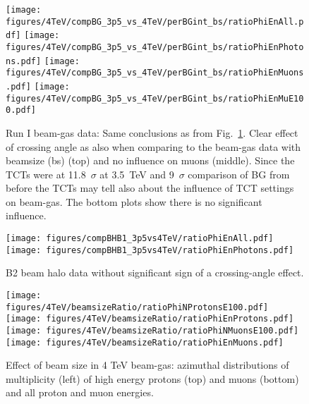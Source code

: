 \begin{figure}
\begin{center}
  \texttt{[image: figures/4TeV/compBG\_3p5\_vs\_4TeV/perBGint\_bs/ratioPhiEnAll.pdf]}
  \texttt{[image: figures/4TeV/compBG\_3p5\_vs\_4TeV/perBGint\_bs/ratioPhiEnPhotons.pdf]}
  \texttt{[image: figures/4TeV/compBG\_3p5\_vs\_4TeV/perBGint\_bs/ratioPhiEnMuons.pdf]}
  \texttt{[image: figures/4TeV/compBG\_3p5\_vs\_4TeV/perBGint\_bs/ratioPhiEnMuE100.pdf]}
\end{center}
\vspace{-0.6cm}
 \caption{Run I beam-gas data: Same conclusions as from Fig.~\ref{xingCompBG2}. Clear effect of crossing angle as also when comparing to the beam-gas data with beamsize (bs) (top) and no influence on muons (middle). Since the TCTs were at 11.8~$\sigma$ at 3.5~TeV and 9~$\sigma$ comparison of BG from before the TCTs may tell also about the influence of TCT settings on beam-gas. The bottom plots show there is no significant influence.
  \label{xingCompBG2}}
\end{figure}

\begin{figure}
  \begin{center}
    \texttt{[image: figures/compBHB1\_3p5vs4TeV/ratioPhiEnAll.pdf]}
    \texttt{[image: figures/compBHB1\_3p5vs4TeV/ratioPhiEnPhotons.pdf]}

\end{center}
\vspace{-0.6cm}
\caption{B2 beam halo data without significant sign of a crossing-angle effect.
  \label{xingCompBHB2}}
\end{figure}

\begin{figure}%
\begin{center}
  \texttt{[image: figures/4TeV/beamsizeRatio/ratioPhiNProtonsE100.pdf]}
  \texttt{[image: figures/4TeV/beamsizeRatio/ratioPhiEnProtons.pdf]}
  \texttt{[image: figures/4TeV/beamsizeRatio/ratioPhiNMuonsE100.pdf]}
  \texttt{[image: figures/4TeV/beamsizeRatio/ratioPhiEnMuons.pdf]}
\end{center}
\vspace{-0.6cm}
 \caption{Effect of beam size in 4 TeV beam-gas: azimuthal distributions of multiplicity (left) of high energy protons (top) and muons (bottom) and all proton and muon energies. 
  \label{bsRatioPhiMP}}
\end{figure}

